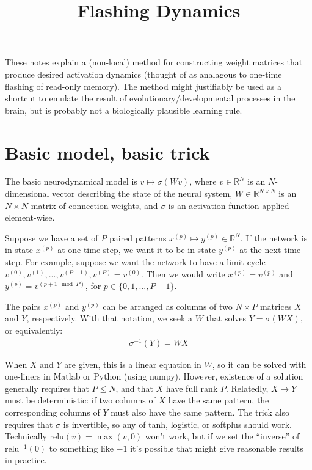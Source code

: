 \documentclass[pdftex,12pt,letterpaper]{article}
\begin{document}
\title{Flashing Dynamics}
\date{}
\maketitle

These notes explain a (non-local) method for constructing weight matrices that produce desired activation dynamics (thought of as analagous to one-time flashing of read-only memory).  The method might justifiably be used as a shortcut to emulate the result of evolutionary/developmental processes in the brain, but is probably not a biologically plausible learning rule.

\section{Basic model, basic trick}

The basic neurodynamical model is $v \mapsto \sigma(Wv)$, where $v\in\mathbb{R}^N$ is an $N$-dimensional vector describing the state of the neural system, $W\in\mathbb{R}^{N\times N}$ is an $N\times N$ matrix of connection weights, and $\sigma$ is an activation function applied element-wise.

Suppose we have a set of $P$ paired patterns $x^{(p)}\mapsto y^{(p)}\in\mathbb{R}^N$.  If the network is in state $x^{(p)}$ at one time step, we want it to be in state $y^{(p)}$ at the next time step.  For example, suppose we want the network to have a limit cycle $v^{(0)}, v^{(1)}, ..., v^{(P-1)}, v^{(P)} = v^{(0)}$.  Then we would write $x^{(p)} = v^{(p)}$ and $y^{(p)} = v^{(p+1 \mod P)}$, for $p\in\{0,1,...,P-1\}$.

The pairs $x^{(p)}$ and $y^{(p)}$ can be arranged as columns of two $N\times P$ matrices $X$ and $Y$, respectively.  With that notation, we seek a $W$ that solves $Y = \sigma(WX)$, or equivalently:
\begin{align}
\sigma^{-1}(Y) = WX\label{eq:cons}
\end{align}

When $X$ and $Y$ are given, this is a linear equation in $W$, so it can be solved with one-liners in Matlab or Python (using numpy).  However, existence of a solution generally requires that $P\leq N$, and that $X$ have full rank $P$.  Relatedly, $X\mapsto Y$ must be deterministic: if two columns of $X$ have the same pattern, the corresponding columns of $Y$ must also have the same pattern.  The trick also requires that $\sigma$ is invertible, so any of tanh, logistic, or softplus should work.  Technically relu$(v) = \max(v,0)$ won't work, but if we set the ``inverse'' of relu$^{-1}(0)$ to something like $-1$ it's possible that might give reasonable results in practice.
\end{document}
